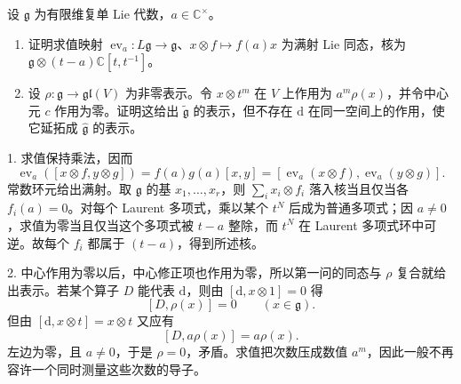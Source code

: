 \begin{exercise}\label{b5:ex:G-evaluation-no-degree}
	设 \(\mathfrak g\) 为有限维复单 Lie 代数，\(a\in\mathbb C^\times\)。
	\begin{enumerate}
		\item 证明求值映射 \(\operatorname{ev}_a:L\mathfrak g\rightarrow\mathfrak g\)、\(x\otimes f\mapsto f(a)x\) 为满射 Lie 同态，核为 \(\mathfrak g\otimes(t-a)\mathbb C[t,t^{-1}]\)。
		\item 设 \(\rho:\mathfrak g\rightarrow\mathfrak{gl}(V)\) 为非零表示。令 \(x\otimes t^m\) 在 \(V\) 上作用为 \(a^m\rho(x)\)，并令中心元 \(c\) 作用为零。证明这给出 \(\widetilde{\mathfrak g}\) 的表示，但不存在 \(\mathrm d\) 在同一空间上的作用，使它延拓成 \(\widehat{\mathfrak g}\) 的表示。
	\end{enumerate}
\end{exercise}
\begin{solution}
	1. 求值保持乘法，因而
	\[
		\operatorname{ev}_a([x\otimes f,y\otimes g])
		=f(a)g(a)[x,y]
		=[\operatorname{ev}_a(x\otimes f),\operatorname{ev}_a(y\otimes g)].
	\]
	常数环元给出满射。取 \(\mathfrak g\) 的基 \(x_1,\ldots,x_r\)，则 \(\sum_i x_i\otimes f_i\) 落入核当且仅当各 \(f_i(a)=0\)。对每个 Laurent 多项式，乘以某个 \(t^N\) 后成为普通多项式；因 \(a\ne0\)，求值为零当且仅当这个多项式被 \(t-a\) 整除，而 \(t^N\) 在 Laurent 多项式环中可逆。故每个 \(f_i\) 都属于 \((t-a)\)，得到所述核。

	2. 中心作用为零以后，中心修正项也作用为零，所以第一问的同态与 \(\rho\) 复合就给出表示。若某个算子 \(D\) 能代表 \(\mathrm d\)，则由 \([\mathrm d,x\otimes1]=0\) 得
	\[
		[D,\rho(x)]=0\qquad(x\in\mathfrak g).
	\]
	但由 \([\mathrm d,x\otimes t]=x\otimes t\) 又应有
	\[
		[D,a\rho(x)]=a\rho(x).
	\]
	左边为零，且 \(a\ne0\)，于是 \(\rho=0\)，矛盾。求值把次数压成数值 \(a^m\)，因此一般不再容许一个同时测量这些次数的导子。
\end{solution}


